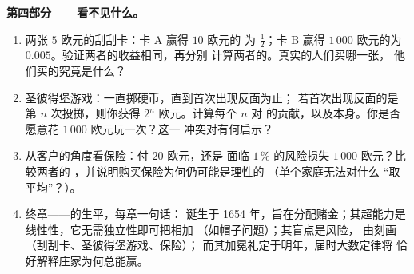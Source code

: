\begin{problem}
\medskip
\noindent\textbf{第四部分——看不见什么。}
\begin{enumerate}[resume]
  \item 两张 $5$ 欧元的刮刮卡：卡 A 赢得 $10$ 欧元的
        为 $\frac12$；卡 B 赢得 $1\,000$ 欧元的为
        $0.005$。验证两者的收益相同，再分别
        计算两者的。真实的人们买哪一张，
        他们买的究竟是什么？
  \item 圣彼得堡游戏：一直掷硬币，直到首次出现反面为止；
        若首次出现反面的是第 $n$ 次投掷，则你获得
        $2^n$ 欧元。计算每个 $n$ 对
        的贡献，以及本身。你是否愿意花
        $1\,000$ 欧元玩一次？这一
        冲突对有何启示？
  \item 从客户的角度看保险：付 $20$ 欧元，还是
        面临 $1\,\%$ 的风险损失 $1\,000$ 欧元？比较两者的
        ，并说明购买保险为何仍可能是理性的
        （单个家庭无法对什么
        “取平均”？）。
  \item 终章——的生平，每章一句话：
        诞生于 1654 年，旨在分配赌金；其超能力是
        线性性，它无需独立性即可把相加
        （如帽子问题）；其盲点是风险，
        由刻画（刮刮卡、圣彼得堡游戏、保险）；
        而其加冕礼定于明年，届时大数定律将
        恰好解释庄家为何总能赢。
\end{enumerate}
\end{problem}
